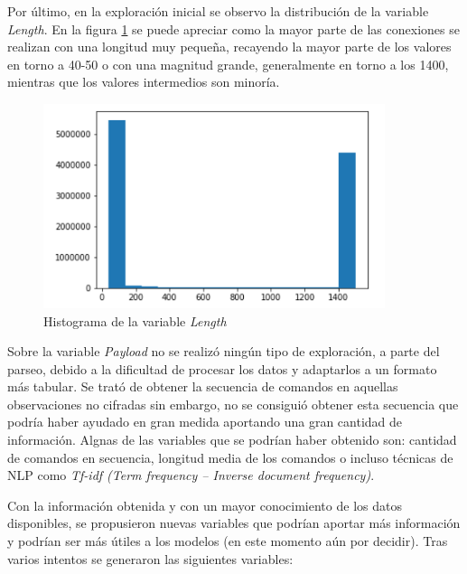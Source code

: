 Por último, en la exploración inicial se observo la distribución de la variable \textit{Length}. En la figura \ref{fig:lenhist} se puede apreciar como la mayor parte de las conexiones se realizan con una longitud muy pequeña,  recayendo la mayor parte de los valores en torno a 40-50 o con una magnitud grande, generalmente en torno a los 1400, mientras que los valores intermedios son minoría.

\begin{figure}[H]
    \centering
    \includegraphics[width=10cm]{figs/lenhist.PNG}
    \caption{Histograma de la variable \textit{Length}}
    \label{fig:lenhist}
\end{figure}

Sobre la variable \textit{Payload} no se realizó ningún tipo de exploración, a parte del parseo, debido a la dificultad de procesar los datos y adaptarlos a un formato más tabular. Se trató de obtener la secuencia de comandos en aquellas observaciones no cifradas sin embargo, no se consiguió obtener esta secuencia que podría haber ayudado en gran medida aportando una gran cantidad de información. Algnas de las variables que se podrían haber obtenido son: cantidad de comandos en secuencia, longitud media de los comandos o incluso técnicas de NLP como \textit{Tf-idf (Term frequency – Inverse document frequency)}.

Con la información obtenida y con un mayor conocimiento de los datos disponibles, se propusieron nuevas variables que podrían aportar más información y podrían ser más útiles a los modelos (en este momento aún por decidir). Tras varios intentos se generaron las siguientes variables:

